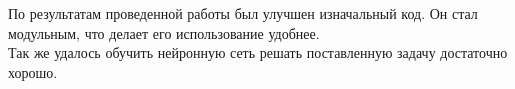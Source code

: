 \documentclass[main.tex]{subfiles}
\begin{document}
По результатам проведенной работы был улучшен изначальный код. Он стал модульным, что делает его использование удобнее.  \\
Так же удалось обучить нейронную сеть решать поставленную задачу достаточно хорошо. 
\end{document}
